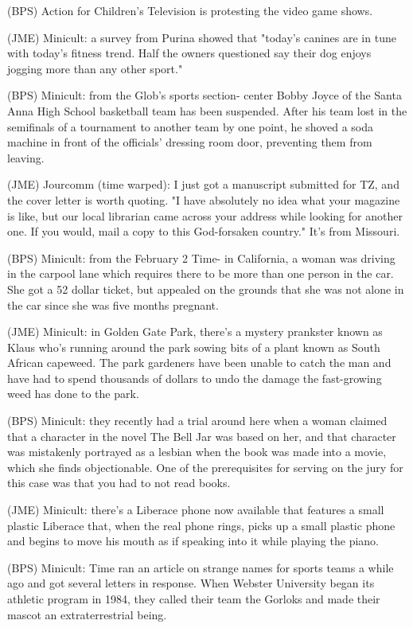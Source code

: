 \documentclass[12pt]{article}
\begin{document}
(BPS) Action for Children's Television is protesting the video game shows.

(JME) Minicult: a survey from Purina showed that "today's canines are in tune with today's fitness trend. Half the owners questioned say their dog enjoys jogging more than any other sport."

(BPS) Minicult: from the Glob's sports section- center Bobby Joyce of the Santa Anna High School basketball team has been suspended. After his team lost in the semifinals of a tournament to another team by one point, he shoved a soda machine in front of the officials' dressing room door, preventing them from leaving.

(JME) Jourcomm (time warped): I just got a manuscript submitted for TZ, and the cover letter is worth quoting. "I have absolutely no idea what your magazine is like, but our local librarian came across your address while looking for another one. If you would, mail a copy to this God-forsaken country." It's from Missouri.

(BPS) Minicult: from the February 2 Time- in California, a woman was driving in the carpool lane which requires there to be more than one person in the car. She got a 52 dollar ticket, but appealed on the grounds that she was not alone in the car since she was five months pregnant.

(JME) Minicult: in Golden Gate Park, there's a mystery prankster known as Klaus who's running around the park sowing bits of a plant known as South African capeweed. The park gardeners have been unable to catch the man and have had to spend thousands of dollars to undo the damage the fast-growing weed has done to the park.

(BPS) Minicult: they recently had a trial around here when a woman claimed that a character in the novel The Bell Jar was based on her, and that character was mistakenly portrayed as a lesbian when the book was made into a movie, which she finds objectionable. One of the prerequisites for serving on the jury for this case was that you had to not read books.

(JME) Minicult: there's a Liberace phone now available that features a small plastic Liberace that, when the real phone rings, picks up a small plastic phone and begins to move his mouth as if speaking into it while playing the piano.

(BPS) Minicult: Time ran an article on strange names for sports teams a while ago and got several letters in response. When Webster University began its athletic program in 1984, they called their team the Gorloks and made their mascot an extraterrestrial being.
\end{document}
